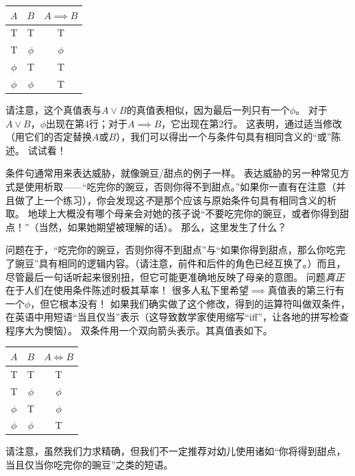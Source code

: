 \begin{center}
\begin{tabular}{c|c||c}
\; $A$ \; & \; $B$ \; & \; $A \implies B$ \; \\ \hline
T & T & T \\
T & $\phi$ & $\phi$\\
 $\phi$ & T & T \\
 $\phi$ &  $\phi$ & T\\
\end{tabular}
\end{center}

\begin{exer} 
请注意，这个真值表与$A \lor B$的真值表相似，因为最后一列只有一个$\phi$。
对于$A \lor B$，$\phi$出现在第4行；对于$A \implies B$，它出现在第2行。
这表明，通过适当修改（用它们的否定替换$A$或$B$），我们可以得出一个与条件句具有相同含义的“或”陈述。
试试看！
\end{exer}

条件句通常用来表达威胁，就像豌豆/甜点的例子一样。
表达威胁的另一种常见方式是使用析取——“吃完你的豌豆，否则你得不到甜点。”如果你一直有在注意（并且做了上一个练习），你会发现这{\em 不}是那个应该与原始条件句具有相同含义的析取。
地球上大概没有哪个母亲会对她的孩子说“不要吃完你的豌豆，或者你得到甜点！”（当然，如果她期望被理解的话）。
那么，这里发生了什么？

问题在于，“吃完你的豌豆，否则你得不到甜点”与“如果你得到甜点，那么你吃完了豌豆”具有相同的逻辑内容。（请注意，前件和后件的角色已经互换了。）而且，尽管最后一句话听起来很别扭，但它可能更准确地反映了母亲的意图。
问题{\em 真正}在于人们在使用条件陈述时极其草率！
很多人私下里希望$\implies$真值表的第三行有一个$\phi$，但它根本没有！
如果我们确实做了这个修改，得到的运算符叫做双条件，在英语中用短语“当且仅当”表示（这导致数学家使用缩写“iff”，让各地的拼写检查程序大为懊恼）。
双条件用一个双向箭头表示。其真值表如下。

\begin{center}
\begin{tabular}{c|c||c}
\; $A$ \; & \; $B$ \; & \; $A \iff B$ \; \\ \hline
T & T & T \\
T & $\phi$ & $\phi$\\
 $\phi$ & T & $\phi$ \\
 $\phi$ &  $\phi$ & T\\
\end{tabular}
\end{center}

请注意，虽然我们力求精确，但我们不一定推荐对幼儿使用诸如“你将得到甜点，当且仅当你吃完你的豌豆”之类的短语。

